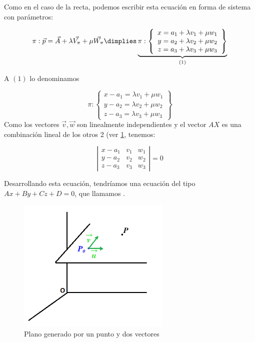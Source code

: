Como en el caso de la recta, podemos escribir esta ecuación en forma de sistema con parámetros:

$$\pi : \vec{p} = \vec{A} + \lambda \vec{V_{\pi}} + \mu\vec{W_{\pi}}\dimplies \underbrace{\pi:\displaystyle \left\{\begin{array}{c} x = a_1 + \lambda v_1 + \mu w_1\\y = a_2 + \lambda v_2 + \mu w_2 \\ z = a_3 + \lambda v_3 + \mu w_3 \end{array}\right\}}_{(1)} $$

 A $(1)$ lo denominamos 

\[
\pi:\displaystyle \left\{
\begin{array}{c} 
x - a_1 = \lambda v_1 + \mu w_1\\
y - a_2 = \lambda v_2 + \mu w_2 \\ 
z - a_3 = \lambda v_3 + \mu w_3 
\end{array}\right\}
\]
Como los vectores $\vec{v},\vec{w}$ son linealmente independientes y el vector $AX$ es una combinación lineal de los otros 2 (ver \ref{fig:plano}, tenemos:

\[
\left|
\begin{array}{ccc} 
x - a_1 & v_1 & w_1\\
y - a_2 & v_2 & w_2 \\ 
z - a_3 & v_3 & w_3 
\end{array}\right| = 0
\]

Desarrollando esta ecuación, tendríamos una ecuación del tipo $Ax+By+Cz + D = 0$, que llamamos .


\begin{figure}[hptb]
    \centering
    \includegraphics[width=0.65\textwidth]{img/ecplanos.png}
    \caption{Plano generado por un punto y dos vectores}
    \label{fig:plano}
\end{figure}

